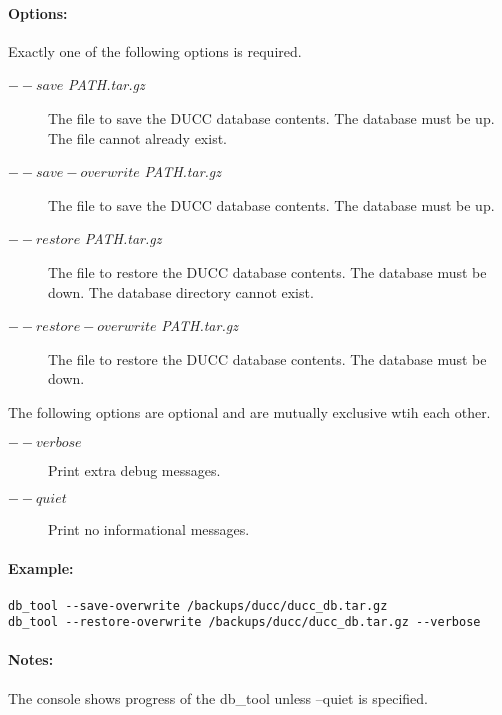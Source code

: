     \paragraph{Options:}
    Exactly one of the following options is required.
    \begin{description}
	        \item[$--save$ {\em PATH.tar.gz}] 
	          The file to save the DUCC database contents.  The database must be up.  The file cannot already exist.
       		\item[$--save-overwrite$ {\em PATH.tar.gz}] 
	          The file to save the DUCC database contents.  The database must be up.
	        \item[$--restore$ {\em PATH.tar.gz}] 
	          The file to restore the DUCC database contents.  The database must be down.  The database directory cannot exist.
	        \item[$--restore-overwrite$ {\em PATH.tar.gz}] 
	          The file to restore the DUCC database contents.  The database must be down.
     \end{description}
	 The following options are optional and are mutually exclusive wtih each other.
	 \begin{description}
	        \item[$--verbose$] 
	          Print extra debug messages.
       		\item[$--quiet$] 
	          Print no informational messages.
     \end{description}
	 
    \paragraph{Example:}
\begin{verbatim}
db_tool --save-overwrite /backups/ducc/ducc_db.tar.gz
db_tool --restore-overwrite /backups/ducc/ducc_db.tar.gz --verbose
\end{verbatim}

    \paragraph{Notes:}
    The console shows progress of the db\_tool unless --quiet is specified.   